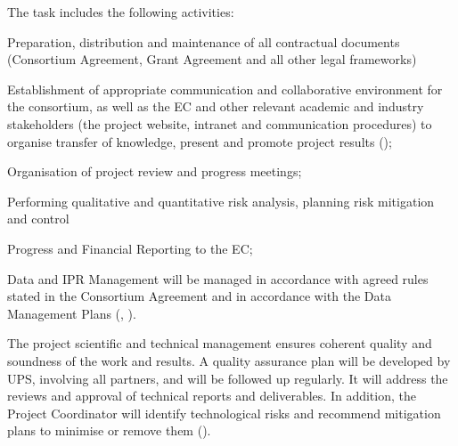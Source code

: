 \begin{workpackage}
\begin{wpdescription}
\end{wpdescription}

\begin{tasklist}

\begin{task}[
  title=Administrative Management,
  id=admin,
  lead=SRL,
  PM=24,
  wphases={0-48},
  partners={SRL,UPSUD,XFEL,QS,SIL,WTT,UIO,EGI,INSERM,CDS,EP}
]
The task includes the following activities:
\begin{compactenum}
\item Preparation, distribution and maintenance of all contractual documents (Consortium Agreement, Grant Agreement and all other legal frameworks)
\item Establishment of appropriate communication and collaborative environment for the consortium, as well as the EC and other relevant academic and industry stakeholders (the project website, intranet and communication procedures) to organise transfer of knowledge, present and promote project results ();
\item Organisation of project review and progress meetings;
\item Performing qualitative and quantitative risk analysis, planning risk mitigation and control
\item Progress and Financial Reporting to the EC;
\item Data and IPR Management will be managed in accordance with agreed rules stated in the Consortium Agreement and in accordance with the Data Management Plans (, ).
\end{compactenum}
\end{task}

\begin{task}[
  title=Technical Project Management,
  id=project-management,
  lead=SRL,
  PM=24,
  wphases={0-48},
  partners={SRL,UPSUD,XFEL,QS,SIL,WTT,UIO,EGI,INSERM,CDS,EP}
]
The project scientific and technical management ensures coherent quality and soundness of the work and results. A quality assurance plan will be developed by UPS, involving all partners, and will be followed up regularly. It will address the reviews and approval of technical reports and deliverables. In addition, the Project Coordinator will identify technological risks and recommend mitigation plans to minimise or remove them ().
\end{task}


\end{tasklist}
\end{workpackage}
